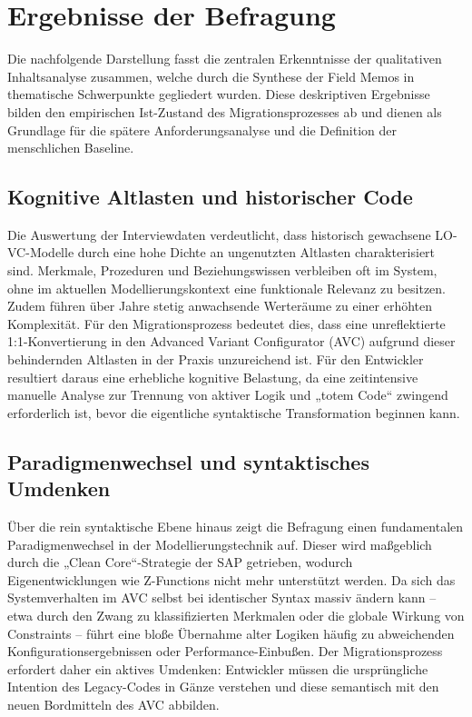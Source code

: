 \section{Ergebnisse der Befragung}
\label{sec:ergebnisse_interview}
Die nachfolgende Darstellung fasst die zentralen Erkenntnisse der qualitativen Inhaltsanalyse zusammen, welche durch die Synthese der Field Memos in thematische Schwerpunkte gegliedert wurden. Diese deskriptiven Ergebnisse bilden den empirischen Ist-Zustand des Migrationsprozesses ab und dienen als Grundlage für die spätere Anforderungsanalyse und die Definition der menschlichen Baseline.

\subsection{Kognitive Altlasten und historischer Code}
Die Auswertung der Interviewdaten verdeutlicht, dass historisch gewachsene LO-VC-Modelle durch eine hohe Dichte an ungenutzten Altlasten charakterisiert sind. Merkmale, Prozeduren und Beziehungswissen verbleiben oft im System, ohne im aktuellen Modellierungskontext eine funktionale Relevanz zu besitzen. Zudem führen über Jahre stetig anwachsende Werteräume zu einer erhöhten Komplexität. Für den Migrationsprozess bedeutet dies, dass eine unreflektierte 1:1-Konvertierung in den Advanced Variant Configurator (AVC) aufgrund dieser behindernden Altlasten in der Praxis unzureichend ist. Für den Entwickler resultiert daraus eine erhebliche kognitive Belastung, da eine zeitintensive manuelle Analyse zur Trennung von aktiver Logik und „totem Code“ zwingend erforderlich ist, bevor die eigentliche syntaktische Transformation beginnen kann.

\subsection{Paradigmenwechsel und syntaktisches Umdenken}
Über die rein syntaktische Ebene hinaus zeigt die Befragung einen fundamentalen Paradigmenwechsel in der Modellierungstechnik auf. Dieser wird maßgeblich durch die „Clean Core“-Strategie der SAP getrieben, wodurch Eigenentwicklungen wie Z-Functions nicht mehr unterstützt werden. Da sich das Systemverhalten im AVC selbst bei identischer Syntax massiv ändern kann – etwa durch den Zwang zu klassifizierten Merkmalen oder die globale Wirkung von Constraints – führt eine bloße Übernahme alter Logiken häufig zu abweichenden Konfigurationsergebnissen oder Performance-Einbußen. Der Migrationsprozess erfordert daher ein aktives Umdenken: Entwickler müssen die ursprüngliche Intention des Legacy-Codes in Gänze verstehen und diese semantisch mit den neuen Bordmitteln des AVC abbilden.

